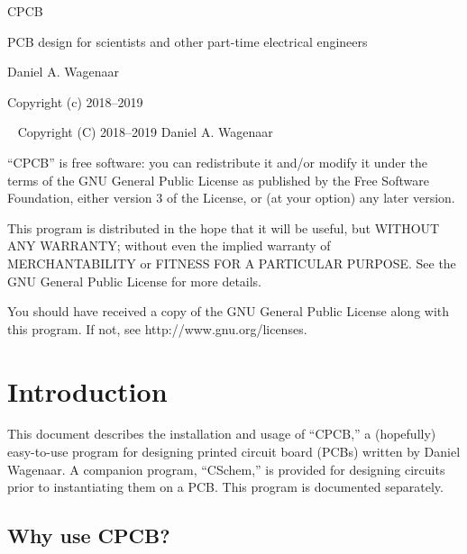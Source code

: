 \documentclass[11pt]{report}
\begin{document}
\thispagestyle{empty}
\begin{centering}
  {\Huge CPCB}
  \vskip30pt

  {\large PCB design for scientists and other part-time electrical engineers}
  \vskip60pt

  {\large Daniel A. Wagenaar}
  \vfill
  
  {Copyright (c) 2018--2019}
  
\end{centering}
\pagebreak
~
\vfill
\noindent Copyright (C) 2018--2019 Daniel A. Wagenaar\medskip

``CPCB'' is free software: you can redistribute it and/or modify
it under the terms of the GNU General Public License as published by
the Free Software Foundation, either version 3 of the License, or
(at your option) any later version.

This program is distributed in the hope that it will be useful,
but WITHOUT ANY WARRANTY; without even the implied warranty of
MERCHANTABILITY or FITNESS FOR A PARTICULAR PURPOSE.  See the
GNU General Public License for more details.

You should have received a copy of the GNU General Public License
along with this program.  If not, see http://www.gnu.org/licenses.
\pagebreak

\chapter{Introduction}

This document describes the installation and usage of ``CPCB,'' a
(hopefully) easy-to-use program for designing printed circuit board
(PCBs) written by Daniel Wagenaar. A companion program, ``CSchem,'' is
provided for designing circuits prior to instantiating them on a
PCB. This program is documented separately.

\section{Why use CPCB?}
\end{document}
